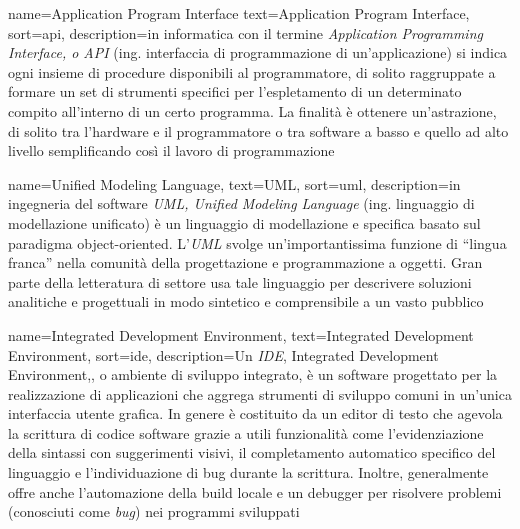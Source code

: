 



 {
    name=Application Program Interface
    text=Application Program Interface,
    sort=api,
    description={in informatica con il termine \emph{Application Programming Interface, o API} (ing. interfaccia di programmazione di un'applicazione) si indica ogni insieme di procedure disponibili al programmatore, di solito raggruppate a formare un set di strumenti specifici per l'espletamento di un determinato compito all'interno di un certo programma. La finalità è ottenere un'astrazione, di solito tra l'hardware e il programmatore o tra software a basso e quello ad alto livello semplificando così il lavoro di programmazione}
}

 {
    name=Unified Modeling Language,
    text=UML,
    sort=uml,
    description={in ingegneria del software \emph{UML, Unified Modeling Language} (ing. linguaggio di modellazione unificato) è un linguaggio di modellazione e specifica basato sul paradigma object-oriented. L'\emph{UML} svolge un'importantissima funzione di ``lingua franca'' nella comunità della progettazione e programmazione a oggetti. Gran parte della letteratura di settore usa tale linguaggio per descrivere soluzioni analitiche e progettuali in modo sintetico e comprensibile a un vasto pubblico}
}

 {
    name=Integrated Development Environment,
    text=Integrated Development Environment,
    sort=ide,
    description={Un \emph{IDE}, Integrated Development Environment,, o ambiente di sviluppo integrato, è un software progettato per la realizzazione di applicazioni che aggrega strumenti di sviluppo comuni in un'unica interfaccia utente grafica. In genere è costituito da un editor di testo che agevola la scrittura di codice software grazie a utili funzionalità come l'evidenziazione della sintassi con suggerimenti visivi, il completamento automatico specifico del linguaggio e l'individuazione di bug durante la scrittura. Inoltre, generalmente offre anche l'automazione della build locale e un debugger per risolvere problemi (conosciuti come \emph{bug}) nei programmi sviluppati}
}

